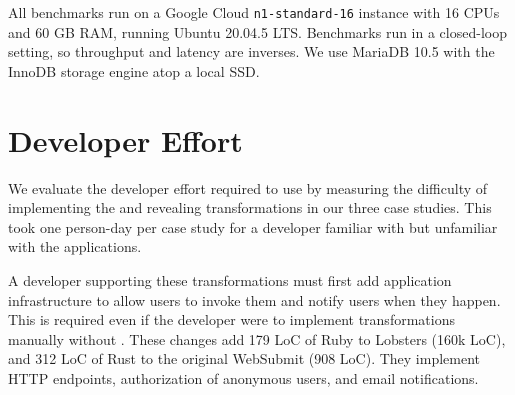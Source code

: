All benchmarks run on a Google Cloud \texttt{n1-standard-16} instance with 16 CPUs
and 60 GB RAM, running Ubuntu 20.04.5 LTS. Benchmarks run in
a closed-loop setting, so throughput and latency are inverses. %
%
We use MariaDB 10.5 with the InnoDB storage engine atop a local SSD.
%

\section{\sys Developer Effort}
\label{s:eval-effort}

%
We evaluate the developer effort required to use \sys by measuring the
difficulty of implementing the \xxing and revealing transformations in our three
case studies.  This took one person-day per case study for a developer
familiar with \sys but unfamiliar with the applications.

A developer supporting these transformations must first add application
infrastructure to allow users to invoke them and notify users when they happen.
This is required even if the developer were to implement transformations
manually without \sys.
%
These changes add 179 LoC of Ruby to Lobsters (160k LoC), and 312 LoC of Rust
to the original WebSubmit (908 LoC). They implement HTTP endpoints,
authorization of anonymous users, and email notifications.
%

